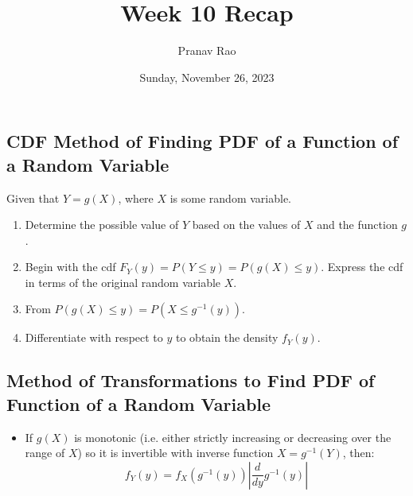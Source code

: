 \documentclass[12pt]{article}
\title{Week 10 Recap}
\author{Pranav Rao}
\date{Sunday, November 26, 2023}
\begin{document}
\maketitle

\subsection{CDF Method of Finding PDF of a Function of a Random Variable}
Given that $Y = g(X)$, where $X$ is some random variable.
\begin{enumerate}
	\item Determine the possible value of $Y$ based on the values of $X$ and
	      the function $g$.
	\item Begin with the cdf $F_Y(y) = P(Y \leq y) = P(g(X) \leq y)$.
	      Express the cdf in terms of the original random variable $X$.
	\item From $P(g(X) \leq y) = P(X \leq g^{-1}(y))$.
	\item Differentiate with respect to $y$ to obtain the density $f_Y(y)$.
\end{enumerate}

\subsection{Method of Transformations to Find PDF of Function of a Random Variable}

\begin{itemize}
	\item If $g(X)$ is monotonic (i.e. either strictly increasing or decreasing over the range of $X$) so it is invertible with inverse function $X = g^{-1}(Y)$, then:
	      \[
		      f_Y(y) = f_X(g^{-1}(y)) \left|\frac{d}{dy} g^{-1}(y)\right|
	      \]
\end{itemize}
\end{document}
